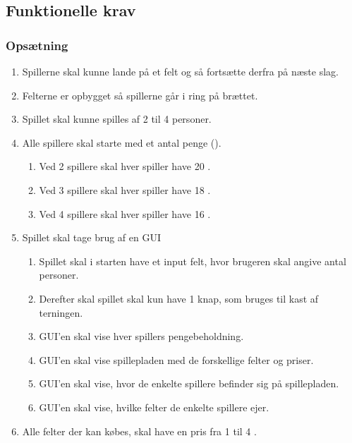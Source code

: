\subsection{Funktionelle krav}
\subsubsection{Opsætning}
\begin{enumerate}
  \item Spillerne skal kunne lande på et felt og så fortsætte derfra på næste slag. 
  \item Felterne er opbygget så spillerne går i ring på brættet.
  \item Spillet skal kunne spilles af 2 til 4 personer.
  \item Alle spillere skal starte med et antal penge
  ({}).
  
  \begin{enumerate}
      \item Ved 2 spillere skal hver spiller have 20 {}.
      \item Ved 3 spillere skal hver spiller have 18 {}.
      \item Ved 4 spillere skal hver spiller have 16 {}.
  \end{enumerate}
  
  \item Spillet skal tage brug af en GUI
  \begin{enumerate}
      \item Spillet skal i starten have et input felt, hvor brugeren skal angive antal personer.
      \item Derefter skal spillet skal kun have 1 knap, som bruges til kast af terningen.
      \item GUI'en skal vise hver spillers pengebeholdning.
      \item GUI'en skal vise spillepladen med de forskellige felter og priser.
      \item GUI'en skal vise, hvor de enkelte spillere befinder sig på spillepladen.
      \item GUI'en skal vise, hvilke felter de enkelte spillere ejer.
  \end{enumerate}
  \item Alle felter der kan købes, skal have en pris fra 1 til 4 {}.
\end{enumerate}



